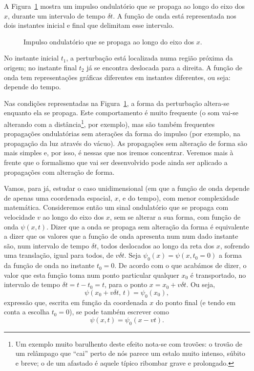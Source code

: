 A Figura~\ref{fig:20-030} mostra um impulso ondulatório que se propaga ao longo
do eixo dos $x$, durante um intervalo de tempo $\delta t$. A função de onda está
representada nos dois instantes inicial e final que delimitam esse intervalo.
\begin{figure}[htb]
    {\centering
        \par
    }
    \caption{Impulso ondulatório que se propaga ao longo do eixo dos
    $x$.\label{fig:20-030}}
\end{figure}
No instante inicial $t_1$, a perturbação está localizada numa região próxima da
origem; no instante final $t_2$ já se encontra deslocada para a
direita. A função de onda tem representações gráficas diferentes em instantes
diferentes, ou seja: depende do tempo.

Nas condições representadas na Figura~\ref{fig:20-030}, a forma da perturbação
altera-se enquanto ela se propaga. Este comportamento é muito frequente (o som
vai-se alterando com a distância\footnote{Um exemplo muito barulhento deste
  efeito nota-se com trovões: o trovão de um relâmpago que ``cai'' perto de nós
  parece um estalo muito intenso, súbito e breve; o de um afastado é aquele
típico ribombar grave e prolongado.}, por exemplo), mas são também frequentes
propagações ondulatórias sem aterações da forma do impulso (por exemplo, na
propagação da luz através do vácuo). As propagações sem alteração de forma são
mais simples e, por isso, é nessas que nos iremos concentrar. Veremos mais à
frente que o formalismo que vai ser desenvolvido pode ainda ser aplicado a
propagações com alteração de forma. 

Vamos, para já, estudar o caso unidimensional (em que a função de onda depende
de apenas uma coordenada espacial, $x$, e do tempo), com menor complexidade
matemática. Consideremos então um sinal ondulatório que se propaga com
velocidade $v$ ao longo do eixo dos $x$, sem se alterar a sua forma, com função
de onda $\psi(x,t)$. Dizer que a onda se propaga sem alteração da forma é
equivalente a dizer que os valores que a função de onda apresenta num num dado
instante são, num intervalo de tempo $\delta t$, todos deslocados ao longo da
reta dos $x$, sofrendo uma translação, igual para todos, de $v\delta t$. Seja
$\psi_0(x)=\psi(x,t_0=0)$ a forma da função de onda no instante $t_0=0$. De
acordo com o que acabámos de dizer, o valor que esta função toma num ponto
particular qualquer $x_0$ é transportado, no intervalo de tempo $\delta
t=t-t_0=t$, para o ponto $x=x_0+v\delta t$. Ou seja,
\begin{equation*}
  \psi(x_0+v\delta t,\,t)=\psi_0(x_0),
\end{equation*}
expressão que, escrita em função da coordenada $x$ do ponto final (e tendo em
conta a escolha $t_0=0$), se pode também escrever como
\begin{equation*}
  \psi(x,t)=\psi_0(x-vt).
\end{equation*}

